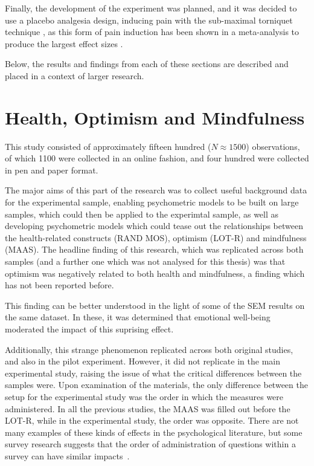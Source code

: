 Finally, the development of the experiment was planned, and it was
decided to use a placebo analgesia design, inducing pain with the
sub-maximal torniquet technique \cite{moore1979submaximal}, as this
form of pain induction has been shown in a meta-analysis to produce
the largest effect sizes \cite{Sauro2005}.

Below, the results and findings from each of these sections are
described and placed in a context of larger research.

\section{Health, Optimism and Mindfulness}
\label{sec:health-optim-mindf}

This study consisted of approximately fifteen hundred ($N \approx
1500$) observations, of which 1100 were collected in an online
fashion, and four hundred were collected in pen and paper format.

The major aims of this part of the research was to collect useful
background data for the experimental sample, enabling psychometric
models to be built on large samples, which could then be applied to
the experimtal sample, as well as developing psychometric models which
could tease out the relationships between the health-related
constructs (RAND MOS), optimism (LOT-R) and mindfulness (MAAS). The
headline finding of this research, which was replicated across both
samples (and a further one which was not analysed for this thesis) was
that optimism was negatively related to both health and mindfulness, a
finding which has not been reported before.

This finding can be better understood in the light of some of the SEM
results on the same dataset. In these, it was determined that
emotional well-being moderated the impact of this suprising effect.


Additionally, this strange phenomenon replicated across both original
studies, and also in the pilot experiment. However, it did not
replicate in the main experimental study, raising the issue of what
the critical differences between the samples were. Upon examination of
the materials, the only difference between the setup for the
experimental study was the order in which the measures were
administered. In all the previous studies, the MAAS was filled out
before the LOT-R, while in the experimental study, the order was
opposite. There are not many examples of these kinds of effects in the psychological literature, but some survey research suggests that the order of administration of questions within a survey can have similar impacts~\cite{schwarz1999self}. 

